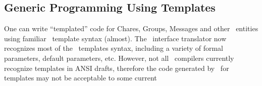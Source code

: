 

\subsection{Generic Programming Using Templates}

One can write ``templated'' code for Chares, Groups, Messages and other
\charmpp\  entities using familiar \CC\ template syntax (almost). The \charmpp\
interface translator now recognizes most of the \CC\ templates syntax,
including a variety of formal parameters, default parameters, etc. However, not
all \CC\ compilers currently recognize templates in ANSI drafts, therefore the
code generated by \charmpp\ for templates may not be acceptable to some current
